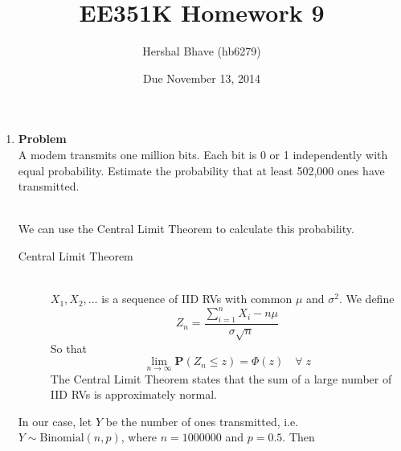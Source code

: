 \documentclass[12pt]{article}
\title{EE351K Homework 9}
\author{Hershal Bhave (hb6279)}
\date{Due November 13, 2014}
\newenvironment{Ex}{\textbf{Problem}\vspace{.75em}\\}{}
\begin{document}
\maketitle
\begin{enumerate}
\item
  \begin{Ex}
    A modem transmits one million bits. Each bit is 0 or 1
    independently with equal probability. Estimate the probability
    that at least 502,000 ones have transmitted.
    \begin{solution} \hfill \vspace{.75em} \\
      We can use the Central Limit Theorem to calculate this
      probability.
      \begin{mdframed}[backgroundcolor=silver]
        \begin{description}
        \item[Central Limit Theorem] \hfill \vspace{.75em} \\
          $X_1, X_2,\ldots$ is a sequence of IID RVs with common $\mu$
          and $\sigma^2$. We define
          $$Z_n=\frac{\sum_{i=1}^n X_i -n\mu}{\sigma\sqrt{n}}$$
          So that
          $$\lim_{n\rightarrow\infty}\mathbf{P}(Z_n\le z) = \Phi(z)
          \quad\forall\; z$$
          The Central Limit Theorem states that the sum of a large
          number of IID RVs is approximately normal.
        \end{description}
      \end{mdframed}
      In our case, let $Y$ be the number of ones transmitted,
      i.e. $Y\sim\text{Binomial}(n,p)$, where $n=1000000$ and
      $p=0.5$. Then


\end{solution}
\end{Ex}
\end{enumerate}
\end{document}
